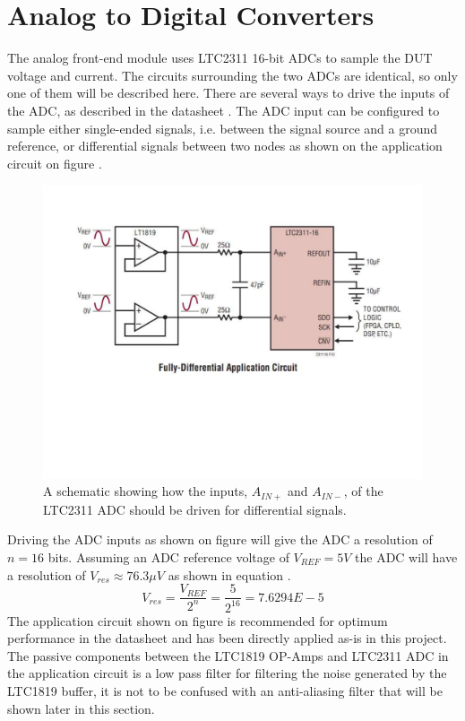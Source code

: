 \section{Analog to Digital Converters} \label{subsec:ADCs}
The analog front-end module uses LTC2311\cite{ADC_LTC2311} 16-bit ADCs to sample the DUT voltage and current. The circuits surrounding the two ADCs are identical, so only one of them will be described here. There are several ways to drive the inputs of the ADC, as described in the datasheet \cite{ADC_LTC2311}. 
The ADC input can be configured to sample either single-ended signals, i.e. between the signal source and a ground reference, or differential signals between two nodes as shown on the application circuit on figure .

\begin{figure}[H]
    \centering
    \includegraphics[clip, trim=0 200 0 50, width=1\textwidth]{Sections/7_SystemDesign/Figures/7_1_ADC_FULLDIFFINPUT.pdf}
    \caption{A schematic showing how the inputs, $A_{IN+}$ and $A_{IN-}$, of the LTC2311 ADC should be driven \cite{ADC_LTC2311} for differential signals.}
    \label{fig_7_1_DRIVEADC}
\end{figure}

Driving the ADC inputs as shown on figure  will give the ADC a resolution of $n = 16$ bits. Assuming an ADC reference voltage of $V_{REF} = 5 V$ the ADC will have a resolution of $V_{res} \approx 76.3 \mu V$ as shown in equation . 
\begin{equation}\label{eq:7_1_2_ADCRES}
    V_{res} = \frac{V_{REF}}{2^n} = \frac{5}{2^{16}} = 7.6294E-5
\end{equation}
The application circuit shown on figure  is recommended for optimum performance in the datasheet and has been directly applied as-is in this project. The passive components between the LTC1819 OP-Amps and LTC2311 ADC in the application circuit is a low pass filter for filtering the noise generated by the LTC1819 buffer, it is not to be confused with an anti-aliasing filter that will be shown later in this section.

